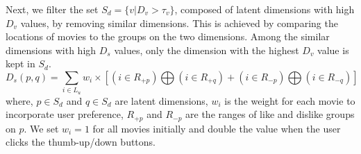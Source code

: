 \documentclass{vgtc}                          %
\begin{document}
Next, we filter the set $S_{d} = \{v | D_v > \tau_{v} \}$, composed of latent dimensions with high $D_v$ values, by removing similar dimensions.
This is achieved by comparing the locations of movies to the groups on the two dimensions.
Among the similar dimensions with high $D_s$ values, only the dimension with the highest $D_v$ value is kept in $S_{d}$.
\begin{equation}
D_s(p, q) = \sum_{i \in L_u} w_i \times 
[(i \in R_{+p}) \bigoplus (i \in R_{+q}) + (i \in R_{-p}) \bigoplus (i \in R_{-q})]
\label{equ:ds}
\end{equation}
where, $p \in S_{d}$ and $q \in S_{d}$ are latent dimensions, $w_i$ is the weight for each movie to incorporate user preference, $R_{+p}$ and $R_{-p}$ are the ranges of like and dislike groups on $p$.
We set $w_i = 1$ for all movies initially and double the value when the user clicks the thumb-up/down buttons.




\end{document}
